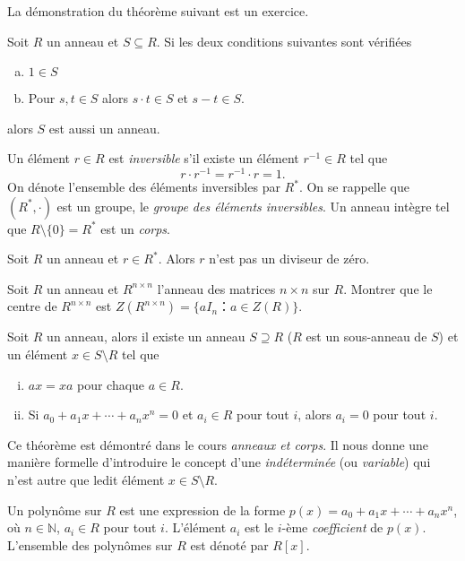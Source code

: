 La démonstration du théorème suivant est un exercice.  
\begin{theorem}
  \label{thr:58}
  Soit $R$ un anneau et $S ⊆R$. Si les deux conditions suivantes sont vérifiées 
  \begin{enumerate}[a)]
  \item $1 ∈ S$ \label{item:27}
  \item Pour $s,t ∈S$ alors  $s⋅t∈S$   et $s-t ∈S$. \label{item:28}
  \end{enumerate} 
  alors $S$ est aussi un anneau. 
\end{theorem}

Un élément $r ∈R$ est \emph{inversible} s'il existe un élément $r^{-1} ∈ R$ tel que
\begin{displaymath}
  r ⋅ r^{-1} = r^{-1} ⋅r = 1. 
\end{displaymath}
On dénote l'ensemble des éléments inversibles par $R^*$. On se rappelle que $(R^*, ⋅)$ est un groupe, le \emph{groupe des éléments inversibles}. Un anneau intègre tel que $R \setminus \{0\} = R^*$ est un \emph{corps}. 

\begin{exercise}
  \label{exe:39}
  Soit $R$ un anneau et $r ∈ R^*$. Alors $r$ n'est pas un diviseur de zéro. 
\end{exercise}

\begin{exercise}
  \label{exe:42}
  Soit $R$ un anneau et $R^{n ×n}$ l'anneau des matrices $n ×n$ sur $R$. Montrer que le centre de $R^{n ×n}$ est $Z(R^{n ×n}) = \{ a I_n ：a ∈Z(R)\}$. 
\end{exercise}

\begin{theorem}
  \label{thr:50}
  Soit $R$ un anneau, alors il existe un anneau $S ⊇R$ ($R$ est un sous-anneau de $S$) et un élément $x ∈ S \setminus R$ tel que
  \begin{enumerate}[(i)]
  \item $a x = x a $ pour chaque $a ∈ R$.
  \item Si 
    $  a_0+ a_1x + \cdots + a_n x^n =0$  et $a_i ∈R$ pour tout $i$,  
    alors  $a_i = 0$ pour tout $i$.
  \end{enumerate}
\end{theorem}
Ce théorème est démontré dans le cours \emph{anneaux et corps}.   Il nous donne une manière formelle d'introduire le concept d'une \emph{indéterminée} (ou  \emph{variable}) qui n'est autre que ledit élément $x ∈ S \setminus R$.  

\begin{definition}
  \label{def:51}
  Un polynôme sur $R$ est une expression de la forme
$p(x) = a_0 + a_1 x + \cdots + a_n x^n$, où $n ∈ℕ$,  $a_i ∈R$ pour tout $i$. L'élément $a_i$ est le $i$-ème \emph{coefficient} de $p(x)$. L'ensemble des polynômes sur $R$ est dénoté par $R[x]$. 
\end{definition}


